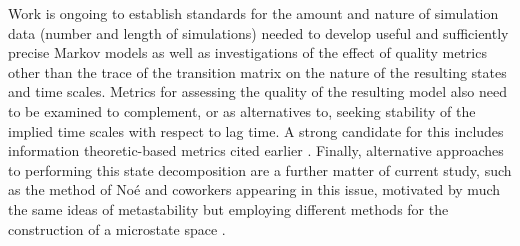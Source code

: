 
Work is ongoing to establish standards for the amount and nature of simulation data (number and length of simulations) needed to develop useful and sufficiently precise Markov models as well as investigations of the effect of quality metrics other than the trace of the transition matrix on the nature of the resulting states and time scales.
Metrics for assessing the quality of the resulting model also need to be examined to complement, or as alternatives to, seeking stability of the implied time scales with respect to lag time.
A strong candidate for this includes information theoretic-based metrics cited earlier \cite{park:2006a}. 
Finally, alternative approaches to performing this state decomposition are a further matter of current study, such as the method of No\'{e} and coworkers appearing in this issue, motivated by much the same ideas of metastability but employing different methods for the construction of a microstate space \cite{noe:jcp:2006}.

